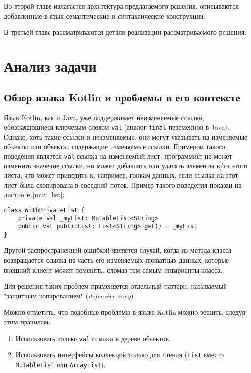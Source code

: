 \documentclass[specification,annotation,times]{itmo-student-thesis}
\begin{document}
Во второй главе излагается архитектура предлагаемого решения, описываются добавленные в язык семантические и синтаксические конструкции.

В третьей главе рассматриваются детали реализации рассматриваемого решения.


\chapter{Анализ задачи}

\section{Обзор языка Kotlin и проблемы в его контексте}\label{existing_kotlin}

Язык Kotlin, как и Java, уже поддерживает неизменяемые ссылки, обозначающиеся ключевым словом \texttt{val} (аналог \texttt{final} переменной в Java\cite{jvm8-spec}). 
Однако, хоть такие ссылки и неизменяемые, они могут указывать на изменяемые объекты или объекты, содержащие изменяемые ссылки.
Примером такого поведения является \texttt{val} ссылка на изменяемый лист: программист не может изменить значение ссылки, но может добавлять или удалять элементы в/из этого листа, что может приводить к, например, гонкам данных, если ссылка на этот лист была скопирована в соседний поток.
Пример такого поведения показан на листинге \ref{mut_list}:

\begin{lstlisting}[float=h!,caption={Backing property},label={mut_list}]
class WithPrivateList {
	private val _myList: MutableList<String>
	public val publicList: List<String> get() = _myList
}
\end{lstlisting}

Другой распространенной ошибкой является случай, когда из метода класса возвращается ссылка на часть его изменяемых приватных данных, которые внешний клиент может поменять, сломав тем самым инварианты класса.

Для решения таких проблем применяется отдельный паттерн, называемый "защитным копированием" (\textit{defensive copy}).

Можно отметить, что подобные проблемы в языке Kotlin можно решить, следуя этим правилам:

\begin{enumerate}
	\item Использовать только \texttt{val} ссылки в дереве объектов.
	\item Использовать интерфейсы коллекций только для чтения (\texttt{List} вместо \texttt{MutableList} или \texttt{ArrayList}).
\end{enumerate}
\end{document}
